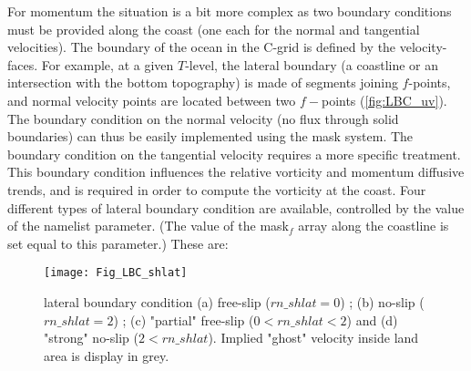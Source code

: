 \documentclass[../tex_main/NEMO_manual]{subfiles}
\begin{document}
For momentum the situation is a bit more complex as two boundary conditions 
must be provided along the coast (one each for the normal and tangential velocities). 
The boundary of the ocean in the C-grid is defined by the velocity-faces. 
For example, at a given $T$-level, the lateral boundary (a coastline or an intersection 
with the bottom topography) is made of segments joining $f$-points, and normal 
velocity points are located between two $f-$points (\autoref{fig:LBC_uv}). 
The boundary condition on the normal velocity (no flux through solid boundaries) 
can thus be easily implemented using the mask system. The boundary condition 
on the tangential velocity requires a more specific treatment. This boundary 
condition influences the relative vorticity and momentum diffusive trends, and is 
required in order to compute the vorticity at the coast. Four different types of 
lateral boundary condition are available, controlled by the value of the  
namelist parameter. (The value of the mask$_{f}$ array along the coastline is set 
equal to this parameter.) These are:

\begin{figure}[!p] \begin{center}
\texttt{[image: Fig\_LBC\_shlat]}
\caption{     \protect\label{fig:LBC_shlat} 
lateral boundary condition (a) free-slip ($rn\_shlat=0$) ; (b) no-slip ($rn\_shlat=2$) 
; (c) "partial" free-slip ($0<rn\_shlat<2$) and (d) "strong" no-slip ($2<rn\_shlat$). 
Implied "ghost" velocity inside land area is display in grey. }
\end{center}    \end{figure}
\end{document}
